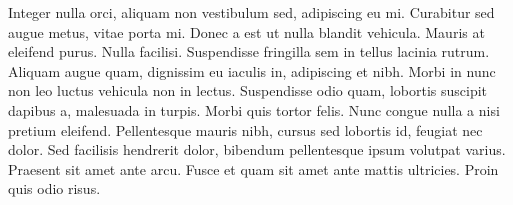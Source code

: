 Integer nulla orci, aliquam non vestibulum sed, adipiscing eu mi. Curabitur sed augue metus, vitae porta mi. Donec a est ut nulla blandit vehicula. Mauris at eleifend purus. Nulla facilisi. Suspendisse fringilla sem in tellus lacinia rutrum. Aliquam augue quam, dignissim eu iaculis in, adipiscing et nibh. Morbi in nunc non leo luctus vehicula non in lectus. Suspendisse odio quam, lobortis suscipit dapibus a, malesuada in turpis. Morbi quis tortor felis. Nunc congue nulla a nisi pretium eleifend. Pellentesque mauris nibh, cursus sed lobortis id, feugiat nec dolor. Sed facilisis hendrerit dolor, bibendum pellentesque ipsum volutpat varius. Praesent sit amet ante arcu. Fusce et quam sit amet ante mattis ultricies. Proin quis odio risus. 


